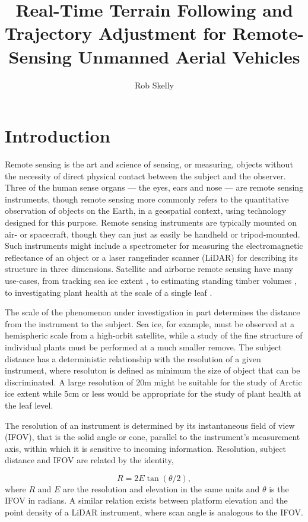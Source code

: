 \documentclass[10pt,a4paper]{report}
\author{Rob Skelly}
\title{Real-Time Terrain Following and Trajectory Adjustment for Remote-Sensing Unmanned Aerial Vehicles}
\begin{document}
\maketitle

\doublespace

\section{Introduction}

Remote sensing is the art and science of sensing, or measuring, objects without the necessity of direct physical contact between the subject and the observer. Three of the human sense organs --- the eyes, ears and nose --- are remote sensing instruments, though remote sensing more commonly refers to the quantitative observation of objects on the Earth, in a geospatial context, using technology designed for this purpose. Remote sensing instruments are typically mounted on air- or spacecraft, though they can just as easily be handheld or tripod-mounted. Such instruments might include a spectrometer for measuring the electromagnetic reflectance of an object or a laser rangefinder scanner (LiDAR) for describing its structure in three dimensions. Satellite and airborne remote sensing have many use-cases, from tracking sea ice extent \cite{Dierking2006}, to estimating standing timber volumes \cite{Allouis2011,Tonolli2011}, to investigating plant health at the scale of a single leaf \cite{Palou2013}.

The scale of the phenomenon under investigation in part determines the distance from the instrument to the subject. Sea ice, for example, must be observed at a hemispheric scale from a high-orbit satellite, while a study of the fine structure of individual plants must be performed at a much smaller remove. The subject distance has a deterministic relationship with the resolution of a given instrument, where resoluton is defined as minimum the size of object that can be discriminated. A large resolution of 20m might be suitable for the study of Arctic ice extent while 5cm or less \cite{Palou2013} would be appropriate for the study of plant health at the leaf level. 

The resolution of an instrument is determined by its instantaneous field of view (IFOV), that is the solid angle or cone, parallel to the instrument's measurement axis, within which it is sensitive to incoming information. Resolution, subject distance and IFOV are related by the identity, 

\begin{equation}
R = 2 E \tan{(\theta / 2)},
\label{eq:ifov}
\end{equation} 
where $R$ and $E$ are the resolution and elevation in the same units and $\theta$ is the IFOV in radians. A similar relation exists between platform elevation and the point density of a LiDAR instrument, where scan angle is analogous to the IFOV. 
\end{document}
